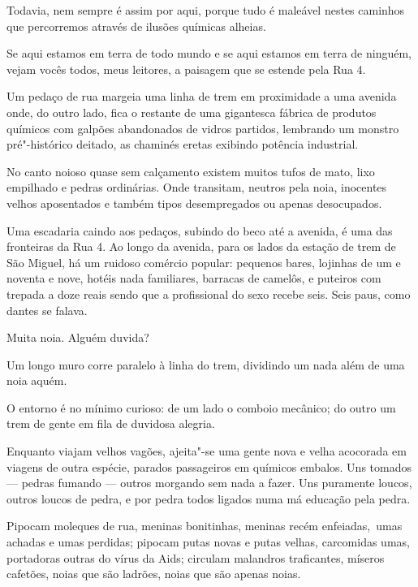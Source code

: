 Todavia, nem sempre é assim por aqui, porque tudo é maleável nestes
caminhos que percorremos através de ilusões químicas alheias.

\asterisc{}

Se aqui estamos em terra de todo mundo e se aqui estamos em terra de
ninguém, vejam vocês todos, meus leitores, a paisagem que se estende
pela Rua 4.

Um pedaço de rua margeia uma linha de trem em proximidade a uma avenida
onde, do outro lado, fica o restante de uma gigantesca fábrica de
produtos químicos com galpões abandonados de vidros partidos, lembrando
um monstro pré"-histórico deitado, as chaminés eretas exibindo potência
industrial.

No canto noioso quase sem calçamento existem muitos tufos de mato, lixo
empilhado e pedras ordinárias. Onde transitam, neutros pela noia,
inocentes velhos aposentados e também tipos desempregados ou apenas
desocupados.

Uma escadaria caindo aos pedaços, subindo do beco até a avenida, é uma
das fronteiras da Rua 4. Ao longo da avenida, para os lados da estação
de trem de São Miguel, há um ruidoso comércio popular: pequenos bares,
lojinhas de um e noventa e nove, hotéis nada familiares, barracas de
camelôs, e puteiros com trepada a doze reais sendo que a profissional do
sexo recebe seis. Seis paus, como dantes se falava.

Muita noia. Alguém duvida?

\asterisc{}

Um longo muro corre paralelo à linha do trem, dividindo um nada além de
uma noia aquém.

O entorno é no mínimo curioso: de um lado o comboio mecânico; do outro
um trem de gente em fila de duvidosa alegria.

Enquanto viajam velhos vagões, ajeita"-se uma gente nova e velha
acocorada em viagens de outra espécie, parados passageiros em químicos
embalos. Uns tomados --- pedras fumando --- outros morgando sem nada a
fazer. Uns puramente loucos, outros loucos de pedra, e por pedra todos
ligados numa má educação pela pedra.

\asterisc{}

Pipocam moleques de rua, meninas bonitinhas, meninas recém
enfeiadas,~umas achadas e umas perdidas; pipocam putas novas e putas
velhas, carcomidas umas, portadoras outras do vírus da Aids; circulam
malandros traficantes, míseros cafetões, noias que são ladrões, noias
que são apenas noias.

